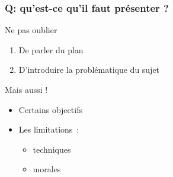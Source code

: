 
\begin{frame}
\frametitle{{\bf \textcolor{redUPEC}{Q}}: qu'est-ce qu'il faut présenter ?}

\begin{block}{Ne pas oublier}
\begin{enumerate}
\item De parler du plan
\item D'introduire la problématique du sujet
\end{enumerate}
\end{block}

\begin{block}{Mais aussi !}
\begin{itemize}
\item Certains objectifs
\item Les limitations~:
 \begin{itemize}
	\item techniques
	\item morales
\end{itemize}
\end{itemize}
\end{block}

\end{frame}


